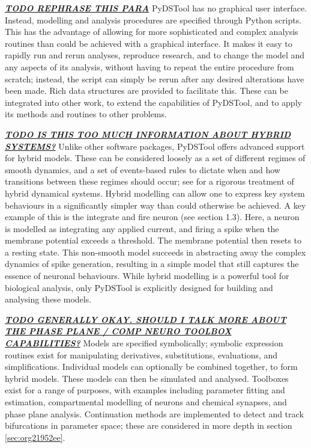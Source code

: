 \documentclass[a4paper,twoside]{article}
\begin{document}
\uline{\textbf{\emph{TODO REPHRASE THIS PARA}}}
PyDSTool has no graphical user interface.
Instead, modelling and analysis procedures are specified through Python scripts.
This has the advantage of allowing for more sophisticated and complex analysis routines than could be achieved with a graphical interface.
It makes it easy to rapidly run and rerun analyses, reproduce research, and to change the model and any aspects of its analysis, without having to repeat the entire procedure from scratch; instead, the script can simply be rerun after any desired alterations have been made.
Rich data structures are provided to facilitate this.
These can be integrated into other work, to extend the capabilities of PyDSTool, and to apply its methods and routines to other problems.

\uline{\textbf{\emph{TODO IS THIS TOO MUCH INFORMATION ABOUT HYBRID SYSTEMS?}}}
Unlike other software packages, PyDSTool offers advanced support for hybrid models.
These can be considered loosely as a set of different regimes of smooth dynamics, and a set of events-based rules to dictate when and how transitions between these regimes should occur; see \cite{simic2005towards} for a rigorous treatment of hybrid dynamical systems.
Hybrid modelling can allow one to express key system behaviours in a significantly simpler way than could otherwise be achieved.
A key example of this is the integrate and fire neuron (see \cite{gerstner2014neuronal} section 1.3).
Here, a neuron is modelled as integrating any applied current, and firing a spike when the membrane potential exceeds a threshold.
The membrane potential then resets to a resting state.
This non-smooth model succeeds in abstracting away the complex dynamics of spike generation, resulting in a simple model that still captures the essence of neuronal behaviours.
While hybrid modelling is a powerful tool for biological analysis, only PyDSTool is explicitly designed for building and analysing these models.

\uline{\emph{\textbf{TODO GENERALLY OKAY. SHOULD I TALK MORE ABOUT THE PHASE PLANE / COMP NEURO TOOLBOX CAPABILITIES?}}}
Models are specified symbolically; symbolic expression routines exist for manipulating derivatives, substitutions, evaluations, and simplifications.
Individual models can optionally be combined together, to form hybrid models.
These models can then be simulated and analysed.
Toolboxes exist for a range of purposes, with examples including parameter fitting and estimation, compartmental modelling of neurons and chemical synapses, and phase plane analysis.
Continuation methods are implemented to detect and track bifurcations in parameter space; these are considered in more depth in section \ref{sec:org21952ee}.
\end{document}
